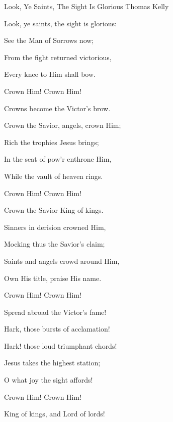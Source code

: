 \documentclass[12pt]{book}
\begin{document}
\begin{song}{Look, Ye Saints, The Sight Is Glorious}{}
  {\SBPubDom}
  {Thomas Kelly}
  {}
  {}

  \begin{SBVerse}
    Look, ye saints, the sight is glorious:

    See the Man of Sorrows now;

    From the fight returned victorious,

    Every knee to Him shall bow.

    Crown Him! Crown Him!

    Crowns become the Victor's brow.
  \end{SBVerse}

  \begin{SBVerse}
    Crown the Savior, angels, crown Him;

    Rich the trophies Jesus brings;

    In the seat of pow'r enthrone Him,

    While the vault of heaven rings.

    Crown Him! Crown Him!

    Crown the Savior King of kings.
  \end{SBVerse}

  \begin{SBVerse}
    Sinners in derision crowned Him,

    Mocking thus the Savior's claim;

    Saints and angels crowd around Him,

    Own His title, praise His name.

    Crown Him! Crown Him!

    Spread abroad the Victor's fame!
  \end{SBVerse}

  \begin{SBVerse}
    Hark, those bursts of acclamation!

    Hark! those loud triumphant chords!

    Jesus takes the highest station;

    O what joy the sight affords!

    Crown Him! Crown Him!

    King of kings, and Lord of lords!
  \end{SBVerse}
\end{song}
\end{document}
